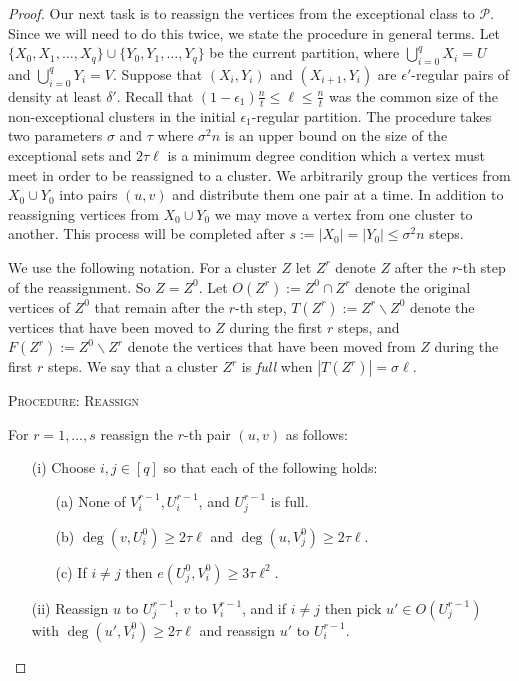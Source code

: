 \documentclass[oneside,12pt]{memoir}
\newcommand{\ep}{\epsilon}
\newcommand{\ssm}{\smallsetminus}
\begin{document}
\begin{proof}
Our next task is to reassign the vertices from the exceptional class
to $\mathcal P$. Since we will need to do this twice, we state the procedure in general terms. Let $\{X_0,X_1,\dots,X_q\}\cup \{Y_0,Y_1,\dots, Y_q\}$ be the current partition, where $\bigcup_{i=0}^q X_i=U$ and $\bigcup_{i=0}^q Y_i=V$.  Suppose that $(X_i,Y_i)$ and $(X_{i+1},Y_i)$ are $\ep'$-regular pairs of density at least $\delta'$.  Recall that $(1-\ep_1)\frac{n}{t}\leq \ell\leq \frac{n}{t}$ was the common size of the non-exceptional clusters in the initial $\ep_1$-regular partition.  The procedure takes two parameters $\sigma$ and $\tau$ where $\sigma^2n$ is an upper bound on the size of the exceptional sets and $2\tau\ell$ is a minimum degree condition which a vertex must meet in order to be reassigned to a cluster.  We arbitrarily group the vertices from $X_0 \cup Y_0$ into pairs $(u,v)$ and distribute them one pair at a time. In addition to reassigning vertices from $X_0\cup Y_0$ we may move a vertex from one cluster to another.  This process will be completed after $s:=|X_0|=|Y_0|\leq \sigma^2 n$ steps.

We use the following notation. For  a cluster $Z$ let  $Z^r$ denote $Z$ after the $r$-th step of the reassignment. So $Z=Z^0$. Let $O(Z^r):=Z^0\cap Z^r$ denote the original vertices of $Z^0$ that remain after the $r$-th step, $T(Z^r):=Z^r\ssm Z^0$ denote the vertices that have been moved to $Z$ during the first $r$ steps, and $F(Z^r):=Z^0\ssm Z^r$ denote the vertices that have been moved from $Z$ during the first $r$ steps. We say that a cluster $Z^r$ is \emph{full} when $|T(Z^r)|=\sigma \ell$.

\vspace{.1in}

\noindent
\textsc{Procedure: Reassign}

For $r=1,\dots,s$ reassign the $r$-th pair $(u,v)$ as follows:
\begin{enumerate}
\item[(i)] Choose $i,j\in [q]$ so that each of the following holds:
\begin{enumerate}
\item[(a)] None of $V_i^{r-1}, U_i^{r-1}$, and  $U_j^{r-1}$ is full.
\item[(b)] $\deg(v,U_i^0) \geq 2\tau \ell$ and $\deg(u, V_j^0) \geq 2\tau \ell$.
\item[(c)] If $i \neq j$ then $e(U_j^0, V_i^0) \geq 3\tau \ell^2.$
\end{enumerate}
\item[(ii)] Reassign $u$ to $U_j^{r-1}$, $v$ to $V_i^{r-1}$, and if $i \neq j$ then pick $u'\in O(U_j^{r-1})$ with $\deg(u',V_i^0) \geq 2\tau \ell$ and reassign $u'$ to $U_i^{r-1}$.
\end{enumerate}



\end{proof}
\end{document}
